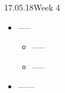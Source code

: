 \documentclass[11pt,a4paper,UKenglish]{article}
\begin{document}
\newpage
\begin{loggentry}{17.05.18}{Week 4}
\begin{itemize}
  \item{-----}
  \begin{itemize}
    \item{-----}
    \item{-----}
  \end{itemize}
  \item{------}
\end{itemize}
\end{loggentry}
\end{document}
